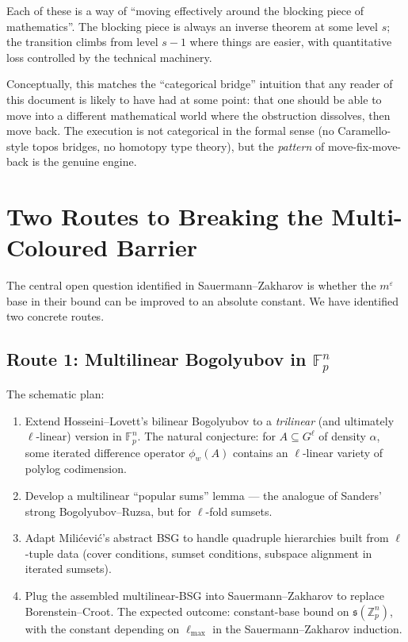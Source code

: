 \documentclass[11pt,a4paper]{article}
\theoremstyle{plain}
\theoremstyle{definition}
\theoremstyle{remark}
\newcommand{\F}{\mathbb{F}}
\newcommand{\Z}{\mathbb{Z}}
\newcommand{\sUFp}{\mathfrak{s}}
\begin{document}
Each of these is a way of ``moving effectively around the blocking piece of mathematics''. The blocking piece is always an inverse theorem at some level $s$; the transition climbs from level $s - 1$ where things are easier, with quantitative loss controlled by the technical machinery.

Conceptually, this matches the ``categorical bridge'' intuition that any reader of this document is likely to have had at some point: that one should be able to move into a different mathematical world where the obstruction dissolves, then move back. The execution is not categorical in the formal sense (no Caramello-style topos bridges, no homotopy type theory), but the \emph{pattern} of move-fix-move-back is the genuine engine.

\section{Two Routes to Breaking the Multi-Coloured Barrier}

The central open question identified in Sauermann--Zakharov is whether the $m^\varepsilon$ base in their bound can be improved to an absolute constant. We have identified two concrete routes.

\subsection{Route 1: Multilinear Bogolyubov in $\F_p^n$}

The schematic plan:

\begin{enumerate}[leftmargin=2em]
  \item Extend Hosseini--Lovett's bilinear Bogolyubov to a \emph{trilinear} (and ultimately $\ell$-linear) version in $\F_p^n$. The natural conjecture: for $A \subseteq G^\ell$ of density $\alpha$, some iterated difference operator $\phi_w(A)$ contains an $\ell$-linear variety of polylog codimension.
  
  \item Develop a multilinear ``popular sums'' lemma --- the analogue of Sanders' strong Bogolyubov--Ruzsa, but for $\ell$-fold sumsets.
  
  \item Adapt Milićević's abstract BSG to handle quadruple hierarchies built from $\ell$-tuple data (cover conditions, sumset conditions, subspace alignment in iterated sumsets).
  
  \item Plug the assembled multilinear-BSG into Sauermann--Zakharov to replace Borenstein--Croot. The expected outcome: constant-base bound on $\sUFp(\Z_p^n)$, with the constant depending on $\ell_{\max}$ in the Sauermann--Zakharov induction.
\end{enumerate}
\end{document}
